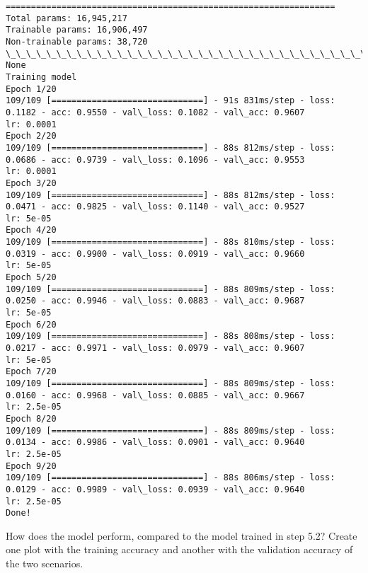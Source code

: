 \documentclass[11pt]{article}
\begin{document}
\begin{Verbatim}[commandchars=\\\{\}]
=================================================================
Total params: 16,945,217
Trainable params: 16,906,497
Non-trainable params: 38,720
\_\_\_\_\_\_\_\_\_\_\_\_\_\_\_\_\_\_\_\_\_\_\_\_\_\_\_\_\_\_\_\_\_\_\_\_\_\_\_\_\_\_\_\_\_\_\_\_\_\_\_\_\_\_\_\_\_\_\_\_\_\_\_\_\_
None
Training model
Epoch 1/20
109/109 [==============================] - 91s 831ms/step - loss: 0.1182 - acc: 0.9550 - val\_loss: 0.1082 - val\_acc: 0.9607
lr: 0.0001
Epoch 2/20
109/109 [==============================] - 88s 812ms/step - loss: 0.0686 - acc: 0.9739 - val\_loss: 0.1096 - val\_acc: 0.9553
lr: 0.0001
Epoch 3/20
109/109 [==============================] - 88s 812ms/step - loss: 0.0471 - acc: 0.9825 - val\_loss: 0.1140 - val\_acc: 0.9527
lr: 5e-05
Epoch 4/20
109/109 [==============================] - 88s 810ms/step - loss: 0.0319 - acc: 0.9900 - val\_loss: 0.0919 - val\_acc: 0.9660
lr: 5e-05
Epoch 5/20
109/109 [==============================] - 88s 809ms/step - loss: 0.0250 - acc: 0.9946 - val\_loss: 0.0883 - val\_acc: 0.9687
lr: 5e-05
Epoch 6/20
109/109 [==============================] - 88s 808ms/step - loss: 0.0217 - acc: 0.9971 - val\_loss: 0.0979 - val\_acc: 0.9607
lr: 5e-05
Epoch 7/20
109/109 [==============================] - 88s 809ms/step - loss: 0.0160 - acc: 0.9968 - val\_loss: 0.0885 - val\_acc: 0.9667
lr: 2.5e-05
Epoch 8/20
109/109 [==============================] - 88s 809ms/step - loss: 0.0134 - acc: 0.9986 - val\_loss: 0.0901 - val\_acc: 0.9640
lr: 2.5e-05
Epoch 9/20
109/109 [==============================] - 88s 806ms/step - loss: 0.0129 - acc: 0.9989 - val\_loss: 0.0939 - val\_acc: 0.9640
lr: 2.5e-05
Done!

    \end{Verbatim}

    How does the model perform, compared to the model trained in step 5.2?
Create one plot with the training accuracy and another with the
validation accuracy of the two scenarios.
\end{document}
